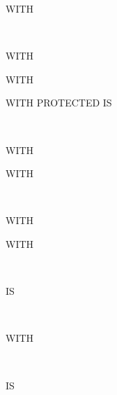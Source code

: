 \begin{0-1}
  WITH
  \begin{1=}
     \\
  \end{1=}
\end{0-1}

\begin{0-1}
WITH 
\end{0-1}

\begin{0-1}
WITH 
\end{0-1}

\begin{0-1}
  WITH PROTECTED  IS
  \begin{1=}
    \identifier \\
    \integer
  \end{1=}
\end{0-1}

\begin{0-1}
WITH 
\end{0-1}

\begin{0-1}
  WITH
  \begin{0-1}
  \end{0-1}
  \begin{1=}
     \\
  \end{1=}
\end{0-1}
  
\begin{0-1}
  WITH 
\end{0-1}

\begin{0-1}
  WITH
  \begin{1=}
     \\
  \end{1=}
  IS
  \begin{1=}
    \identifier \\
    \integer
  \end{1=}
\end{0-1}

\begin{0-1}
  WITH
  \begin{1=}
     \\
  \end{1=}
  IS
  \begin{1=}
    \identifier \\
    \integer
  \end{1=}
\end{0-1}

